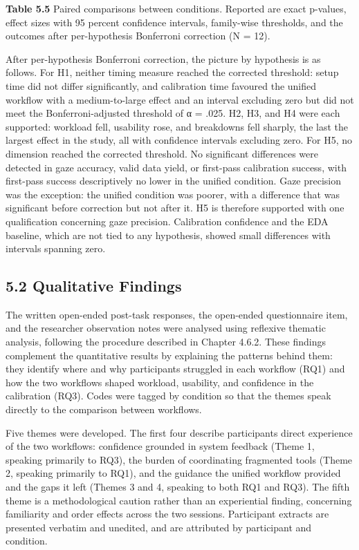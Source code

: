 \documentclass[
]{article}
\begin{document}
%
\textbf{Table 5.5} Paired comparisons between conditions. Reported are exact p-values, effect sizes with 95 percent confidence intervals, family-wise thresholds, and the outcomes after per-hypothesis Bonferroni correction (N = 12).

After per-hypothesis Bonferroni correction, the picture by hypothesis is as follows. For H1, neither timing measure reached the corrected threshold: setup time did not differ significantly, and calibration time favoured the unified workflow with a medium-to-large effect and an interval excluding zero but did not meet the Bonferroni-adjusted threshold of α = .025. H2, H3, and H4 were each supported: workload fell, usability rose, and breakdowns fell sharply, the last the largest effect in the study, all with confidence intervals excluding zero. For H5, no dimension reached the corrected threshold. No significant differences were detected in gaze accuracy, valid data yield, or first-pass calibration success, with first-pass success descriptively no lower in the unified condition. Gaze precision was the exception: the unified condition was poorer, with a difference that was significant before correction but not after it. H5 is therefore supported with one qualification concerning gaze precision. Calibration confidence and the EDA baseline, which are not tied to any hypothesis, showed small differences with intervals spanning zero.

\hypertarget{qualitative-findings}{%
\subsection{5.2 Qualitative Findings}\label{qualitative-findings}}

The written open-ended post-task responses, the open-ended questionnaire item, and the researcher observation notes were analysed using reflexive thematic analysis, following the procedure described in Chapter 4.6.2. These findings complement the quantitative results by explaining the patterns behind them: they identify where and why participants struggled in each workflow (RQ1) and how the two workflows shaped workload, usability, and confidence in the calibration (RQ3). Codes were tagged by condition so that the themes speak directly to the comparison between workflows.

Five themes were developed. The first four describe participants\textquotesingle{} direct experience of the two workflows: confidence grounded in system feedback (Theme 1, speaking primarily to RQ3), the burden of coordinating fragmented tools (Theme 2, speaking primarily to RQ1), and the guidance the unified workflow provided and the gaps it left (Themes 3 and 4, speaking to both RQ1 and RQ3). The fifth theme is a methodological caution rather than an experiential finding, concerning familiarity and order effects across the two sessions. Participant extracts are presented verbatim and unedited, and are attributed by participant and condition.
\end{document}
